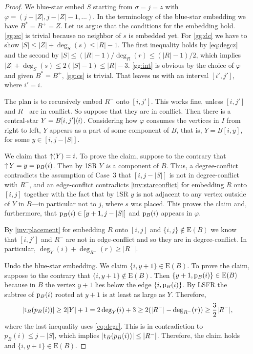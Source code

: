 \documentclass[11pt,a4paper,colorlinks=true,urlcolor=blue,citecolor=red]{article}
\theoremstyle{plain}
\newcommand{\EB}{\mathrm{E}(B)}
\begin{document}
\begin{proof}
  We blue-star embed $S$ starting from $\sigma=j=z$ with
  $\varphi=(j-|Z|,j-|Z|-1,\ldots)$. In the terminology of the
  blue-star embedding we have $B^*=B^+=Z$. Let us argue that the
  conditions for the embedding hold. \ref{gg:ec} is trivial because no
  neighbor of $s$ is embedded yet. For \ref{gg:dc} we have to show
  $|S|\le|Z|+\deg_S(s)\le|R|-1$. The first inequality holds by
  \eqref{eq:degcz} and the second by
  $|S|\le(|R|-1)/\deg_R(r)\le(|R|-1)/2$, which implies
  $|Z|+\deg_S(s)\le 2(|S|-1)\le|R|-3$. \ref{gg:int} is obvious by the
  choice of $\varphi$ and given $B^*=B^+$, \ref{gg:cs} is trivial.
That leaves us with an interval $[i',j']$, where $i'=i$.

  The plan is to recursively embed $R^-$ onto $[i,j']$. This works fine,
  unless $[i,j']$ and $R^-$ are in conflict. So suppose that they are in
  conflict. Then there is a central-star
  $Y=B{[i,j']}\langle{i}\rangle$. Considering how $\varphi$ consumes the
  vertices in $I$ from right to left, $Y$ appears as a part of some
  component of $B$, that is, $Y=B[i,y]$, for some $y\in[i,j-|S|]$.

  We claim that $\mathop{\uparrow}(Y)=i$. To prove the claim, suppose to the
  contrary that $\mathop{\uparrow}{Y}=y=\mathrm p_B(i)$. Then by 1SR $Y$ \emph{is} a
  component of $B$. Thus, a degree-conflict contradicts the assumption
  of Case~3 that $[i,j-|S|]$ is not in degree-conflict with $R^-$, and
  an edge-conflict contradicts \ref{inv:starconflict} for embedding $R$
  onto $[i,j]$ together with the fact that by 1SR $y$ is not adjacent to
  any vertex outside of $Y$ in $B$---in particular not to $j$, where $s$
  was placed. This proves the claim and, furthermore, that
  $\mathrm p_B(i)\in[y+1,j-|S|]$ and $\mathrm p_B(i)$ appears in $\varphi$.

  By \ref{inv:placement} for embedding $R$ onto $[i,j]$ and
  $\{i,j\}\notin\EB$ we know that $[i,j']$ and $R^-$ are not in
  edge-conflict and so they are in degree-conflict.  In particular,
  $\deg_Y(i)+\deg_{R^-}(r)\ge|R^-|$.

  Undo the blue-star embedding. We claim $\{i,y+1\}\in\EB$. To prove the claim, suppose to the contrary that
  $\{i,y+1\}\notin\EB$. Then $\{y+1,\p_B(i)\}\in\EB$ because in $B$ the
  vertex $y+1$ lies below the edge $\{i,\mathrm p_B(i)\}$. By LSFR the subtree
  of $\mathrm p_B(i)$ rooted at $y+1$ is at least as large as $Y$. Therefore,
  \[
  |\mathrm t_B(p_B(i))|\ge 2|Y|+1=2\deg_Y(i)+3\ge 2(|R^-|-\deg_{R^-}(r))\ge
  \frac{3}{2}|R^-|,
  \]
where the last inequality uses \eqref{eq:degr}. This is in
  contradiction to $p_B(i)\le j-|S|$, which implies
  $|\mathrm t_B(p_B(i))|\le|R^-|$. Therefore, the claim holds and
  $\{i,y+1\}\in\EB$.


\end{proof}
\end{document}
